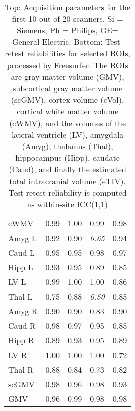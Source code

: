 \begin{table}
\begin{tabular}{lllll}
\midrule
cWMV                  &               0.99 &               1.00 &                 0.99 &                 0.98 \\
Amyg L                &               0.92 &               0.90 &                 \textit{0.65} &                 0.94 \\
Caud L                &               0.95 &               0.95 &                 0.98 &                 0.97 \\
Hipp L                &               0.93 &               0.95 &                 0.89 &                 0.85 \\
LV L                  &               0.99 &               1.00 &                 1.00 &                 0.86 \\
Thal L                &               0.75 &               0.88 &                 \textit{0.50} &                 0.85 \\
Amyg R                &               0.90 &               0.90 &                 0.83 &                 0.90 \\
Caud R                &               0.98 &               0.97 &                 0.95 &                 0.85 \\
Hipp R                &               0.89 &               0.93 &                 0.95 &                 0.89 \\
LV R                  &               1.00 &               1.00 &                 1.00 &                 0.72 \\
Thal R                &               0.88 &               0.84 &                 0.73 &                 0.82 \\
scGMV                 &               0.98 &               0.96 &                 0.98 &                 0.93 \\
GMV                   &               0.96 &               0.99 &                 0.98 &                 0.98 \\
\bottomrule
\end{tabular}
\caption{Top: Acquisition parameters for the first 10 out of 20 scanners. Si = Siemens, Ph = Philips, GE= General Electric. Bottom: Test-retest reliabilities for selected ROIs, processed by Freesurfer. The ROIs are gray matter volume (GMV), subcortical gray matter volume (scGMV), cortex volume (cVol), cortical white matter volume (cWMV), and the volumes of the lateral ventricle (LV), amygdala (Amyg), thalamus (Thal), hippocampus (Hipp), caudate (Caud), and finally the estimated total intracranial volume (eTIV). Test-retest reliability is computed as within-site ICC(1,1)} 
\label{tab:acquisition1}

\end{table}
